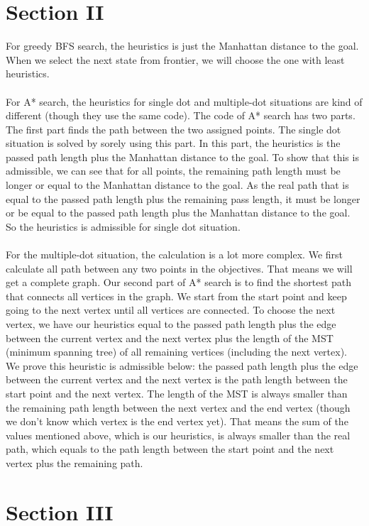 \documentclass{mcmthesis}
\begin{document}
\section{Section II}
For greedy BFS search, the heuristics is just the Manhattan distance to the goal. When we select the next state from frontier, we will choose the one with least heuristics. \\
\\
For A* search, the heuristics for single dot and multiple-dot situations are kind of different (though they use the same code). The code of A* search has two parts. The first part finds the path between the two assigned points. The single dot situation is solved by sorely using this part. In this part, the heuristics is the passed path length plus the Manhattan distance to the goal. To show that this is admissible, we can see that for all points, the remaining path length must be longer or equal to the Manhattan distance to the goal. As the real path that is equal to the passed path length plus the remaining pass length, it must be longer or be equal to the passed path length plus the Manhattan distance to the goal. So the heuristics is admissible for single dot situation. \\
\\
For the multiple-dot situation, the calculation is a lot more complex. We first calculate all path between any two points in the objectives. That means we will get a complete graph. Our second part of A* search is to find the shortest path that connects all vertices in the graph. We start from the start point and keep going to the next vertex until all vertices are connected. To choose the next vertex, we have our heuristics equal to the passed path length plus the edge between the current vertex and the next vertex plus the length of the MST (minimum spanning tree) of all remaining vertices (including the next vertex). We prove this heuristic is admissible below: the passed path length plus the edge between the current vertex and the next vertex is the path length between the start point and the next vertex. The length of the MST is always smaller than the remaining path length between the next vertex and the end vertex (though we don’t know which vertex is the end vertex yet). That means the sum of the values mentioned above, which is our heuristics, is always smaller than the real path, which equals to the path length between the start point and the next vertex plus the remaining path.

\pagebreak
\section{Section III}
\end{document}
